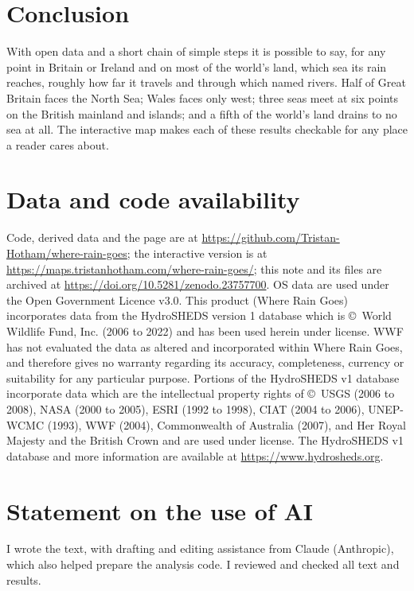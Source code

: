 \documentclass[11pt,a4paper]{article}
\begin{document}
\section{Conclusion}

With open data and a short chain of simple steps it is possible to say, for any point in Britain or Ireland and on most of the world's land, which sea its rain reaches, roughly how far it travels and through which named rivers. Half of Great Britain faces the North Sea; Wales faces only west; three seas meet at six points on the British mainland and islands; and a fifth of the world's land drains to no sea at all. The interactive map makes each of these results checkable for any place a reader cares about.

\section*{Data and code availability}

Code, derived data and the page are at \url{https://github.com/Tristan-Hotham/where-rain-goes}; the interactive version is at \url{https://maps.tristanhotham.com/where-rain-goes/}; this note and its files are archived at \url{https://doi.org/10.5281/zenodo.23757700}. OS data are used under the Open Government Licence v3.0. This product (Where Rain Goes) incorporates data from the HydroSHEDS version 1 database which is \copyright\ World Wildlife Fund, Inc. (2006 to 2022) and has been used herein under license. WWF has not evaluated the data as altered and incorporated within Where Rain Goes, and therefore gives no warranty regarding its accuracy, completeness, currency or suitability for any particular purpose. Portions of the HydroSHEDS v1 database incorporate data which are the intellectual property rights of \copyright\ USGS (2006 to 2008), NASA (2000 to 2005), ESRI (1992 to 1998), CIAT (2004 to 2006), UNEP-WCMC (1993), WWF (2004), Commonwealth of Australia (2007), and Her Royal Majesty and the British Crown and are used under license. The HydroSHEDS v1 database and more information are available at \url{https://www.hydrosheds.org}.

\section*{Statement on the use of AI}

I wrote the text, with drafting and editing assistance from Claude (Anthropic), which also helped prepare the analysis code. I reviewed and checked all text and results.
\end{document}
